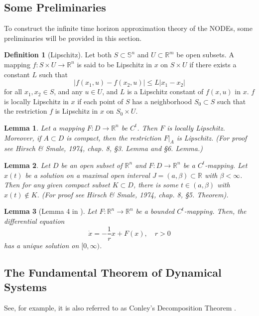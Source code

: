 \documentclass{article}
\newtheorem{lemma}{Lemma}
\theoremstyle{definition}
\newtheorem{definition}{Definition}
\theoremstyle{remark}
\newcounter{ct}
\begin{document}
\subsection{Some Preliminaries}
To construct the infinite time horizon approximation theory of the NODEs, some preliminaries will be provided in this section.

\begin{definition}[Lipschitz]
 Let both $S \subset \mathbb{S}^n$ and $U \subset \mathbb{R}^m$ be open subsets.
 A mapping $f: S \times U \rightarrow \mathbb{R}^n$ is said to be Lipschitz in $x$ on $S \times U$ if there exists a constant $L$ such that
\[
|f(x_1, u) - f(x_2, u)| \leq L |x_1 - x_2|
\]
for all $x_1, x_2 \in S$, and any $u \in U$, and $L$ is a Lipschitz constant of $f(x, u)$ in $x$. $f$ is locally Lipschitz in $x$ if each point of $S$ has a neighborhood $S_0 \subset S$ such that the restriction $f$ is Lipschitz in $x$ on $S_0 \times U$.
\end{definition}


\begin{lemma}
Let a mapping \( F : D \to \mathbb{R}^n \) be \( C^t \). 
Then \( F \) is locally Lipschitz. Moreover, if \( A \subset D \) is compact, then the restriction \( F|_A \) is Lipschitz.
(For proof see Hirsch \& Smale, 1974, chap. 8, §3. Lemma and §6. Lemma.)
\end{lemma}	


\begin{lemma}
Let \( D \) be an open subset of \( \mathbb{R}^n \) and \( F : D \to \mathbb{R}^n \) be a \( C^t \)-mapping. 
Let \( x(t) \) be a solution on a maximal open interval \( J = (a, \beta) \subset \mathbb{R} \) with \( \beta < \infty \). 
Then for any given compact subset \( K \subset D \), there is some \( t \in (a, \beta) \) with \( x(t) \notin K \). 
(For proof see Hirsch \& Smale, 1974, chap. 8, §5. Theorem).
\end{lemma}	


\begin{lemma}[Lemma 4 in \citep{funahashi1993approximation}]
Let \( F: \mathbb{R}^n \to \mathbb{R}^n \) be a bounded \( C^t \)-mapping. Then, the differential equation
\[
\dot{x} = -\frac{1}{r} x + F(x), \quad r > 0
\]
has a unique solution on \([0, \infty)\).
\end{lemma}	





\subsection{The Fundamental Theorem of Dynamical Systems}
See, for example\citep{conley1978morse, norton1995fundamental}, it is also referred to as Conley's Decomposition Theorem \citep{mischaikow1999cit}.
\end{document}
